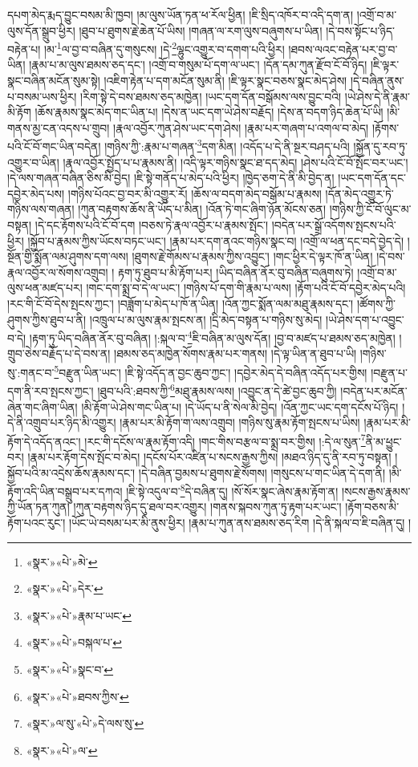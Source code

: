 དཔག་མེད་རྨད་བྱུང་བསམ་མི་ཁྱབ། །མ་ལུས་ཡོན་ཏན་ཕ་རོལ་ཕྱིན། །ཇི་སྲིད་འཁོར་བ་འདི་དག་ན། །འགྲོ་བ་མ་ལུས་དོན་སྒྲུབ་ཕྱིར། །ཐུབ་པ་ཐུགས་རྗེ་ཆེན་པོ་ཡིས། །གཞན་ལ་རག་ལུས་བཞུགས་པ་ཡིན། །དེ་བས་སྟོང་པ་ཉིད་བརྟེན་པ། །མ་\footnote{«སྣར་»«པེ་»མེ་}ལ་བྱ་བ་བཞིན་དུ་གསུངས། །དེ་\footnote{«སྣར་»«པེ་»དེར་}ལྷུང་འགྱུར་བ་དགག་པའི་ཕྱིར། །ཐབས་ལའང་བརྟེན་པར་བྱ་བ་ཡིན། །རྣམ་པ་མ་ལུས་ཐམས་ཅད་དང་། །འགྲོ་བ་གསུམ་པོ་དག་ལ་ཡང་། །དོན་དམ་ཀུན་རྫོབ་ངོ་བོ་ཉིད། །ཇི་ལྟར་སྣང་བཞིན་མངོན་སུམ་སྟེ། །འཇིག་རྟེན་པ་དག་མངོན་སུམ་ནི། །ཇི་ལྟར་སྣང་བཅས་སྣང་མེད་ཤེས། །དེ་བཞིན་ནུས་པ་བསམ་ཡས་ཕྱིར། །རིག་སྟེ་དེ་བས་ཐམས་ཅད་མཁྱེན། །ཡང་དག་དོན་བསྒོམས་ལས་བྱུང་བའི། །ཡེ་ཤེས་དེ་ནི་རྣམ་མི་རྟོག །ཆོས་རྣམས་སྣང་མེད་གང་ཡིན་པ། །དེས་ན་ཡང་དག་ཡེ་ཤེས་བརྗོད། །དེས་ན་བདག་ཉིད་ཆེན་པོ་ཡི། །མི་གནས་མྱ་ངན་འདས་པ་གྲུབ། །རྣལ་འབྱོར་ཀུན་ཤེས་ཡང་དག་ཤེས། །རྣམ་པར་གཞག་པ་འགལ་བ་མེད། །རྟོགས་པའི་ངོ་བོ་གང་ཡིན་བདེན། །གཉིས་ཀྱི་:རྣམ་པ་གཞན་\footnote{«སྣར་»«པེ་»རྣམ་པ་ཡང་}དག་མིན། །འདོད་པ་དེ་ནི་སྔར་བཤད་པའི། །སྐྱོན་དུ་རབ་ཏུ་འགྱུར་བ་ཡིན། །རྣལ་འབྱོར་སྤྱོད་པ་པ་རྣམས་ནི། །འདི་ལྟར་གཉིས་སྣང་ཐ་དད་མེད། །ཤེས་པའི་ངོ་བོ་སྤོང་བར་ཡང་། །དེ་ལས་གཞན་བཞིན་ཅིས་མི་བྱེད། །ཇི་སྟེ་གནོད་པ་མེད་པའི་ཕྱིར། །ཁྱེད་ཅག་དེ་ནི་མི་བྱེད་ན། །ཡང་དག་དོན་དང་དབྱེར་མེད་པས། །གཉིས་པོའང་བྱ་བར་མི་འགྱུར་རོ། །ཆོས་ལ་བདག་མེད་བསྒོམ་པ་རྣམས། །དོན་མེད་འགྱུར་ཏེ་གཉིས་ལས་གཞན། །ཀུན་བརྟགས་ཆོས་ནི་ཡོད་པ་མིན། །འོན་ཏེ་གང་ཞིག་ཉོན་མོངས་ཅན། །གཉིས་ཀྱི་ངོ་བོ་ལུང་མ་བསྟན། །དེ་དང་རྟོགས་པའི་ངོ་བོ་དག །བཅས་ཏེ་རྣལ་འབྱོར་པ་རྣམས་སྤོང་། །བདེན་པར་སྒྲོ་འདོགས་སྤངས་པའི་ཕྱིར། །སྐྱོབ་པ་རྣམས་ཀྱིས་ཡོངས་བཏང་ཡང་། །རྣམ་པར་དག་ནའང་གཉིས་སྣང་བ། །འགྲོ་ལ་ཕན་དང་བདེ་བྱེད་དེ། །སྔོན་གྱི་སྨོན་ལམ་ཤུགས་དག་ལས། །ཐུགས་རྗེ་གོམས་པ་རྣམས་ཀྱིས་འབྱུང་། །གང་ཕྱིར་དེ་ལྟར་ཁོ་ན་ཡིན། །དེ་བས་རྣལ་འབྱོར་ལ་སོགས་འགྲུབ། །
རྟག་ཏུ་ཐུབ་པ་མི་རྟོག་པར། །ཡིད་བཞིན་ནོར་བུ་བཞིན་བཞུགས་ཏེ། །འགྲོ་བ་མ་ལུས་ཕན་མཛད་པར། །གང་དག་སྨྲ་བ་དེ་ལ་ཡང་། །གཉིས་པོ་དག་གི་རྣམ་པ་ལས། །རྟོག་པའི་ངོ་བོ་དབྱེར་མེད་པའི། །རང་གི་ངོ་བོ་དེས་སྤངས་ཀྱང་། །བཟློག་པ་མེད་པ་ཁོ་ན་ཡིན། །འོན་ཀྱང་སྨོན་ལམ་མཐུ་རྣམས་དང་། །ཚོགས་ཀྱི་ཤུགས་ཀྱིས་ཐུབ་པ་ནི། །འཁྲུལ་པ་མ་ལུས་རྣམ་སྤངས་ན། །དྲི་མེད་བསྟན་པ་གཉིས་སུ་མེད། །ཡེ་ཤེས་དག་པ་འབྱུང་བ་དེ། །རྟག་ཏུ་ཡིད་བཞིན་ནོར་བུ་བཞིན། །:སྐལ་བ་\footnote{«སྣར་»«པེ་»བསྐལ་པ་}ཇི་བཞིན་མ་ལུས་དོན། །བྱ་བ་མཛད་པ་ཐམས་ཅད་མཁྱེན། །གྲུབ་ཅེས་བརྗོད་པ་དེ་བས་ན། །ཐམས་ཅད་མཁྱེན་སོགས་རྣམ་པར་གནས། །དེ་ལྟ་ཡིན་ན་ཐུབ་པ་ཡི། །གཉིས་སུ་:གནང་བ་\footnote{«སྣར་»«པེ་»སྣང་བ་}བརྫུན་ཡིན་ཡང་། །ཇི་སྟེ་འདོད་ན་བྱང་ཆུབ་ཀྱང་། །དབྱེར་མེད་དེ་བཞིན་འདོད་པར་གྱིས། །བརྫུན་པ་དག་ནི་རབ་སྤངས་ཀྱང་། །ཐུབ་པའི་:ཐབས་ཀྱི་\footnote{«སྣར་»«པེ་»ཐབས་ཀྱིས་}མཐུ་རྣམས་ལས། །འབྱུང་ན་དེ་ཚེ་བྱང་ཆུབ་ཀྱི། །བདེན་པར་མངོན་ཞེན་གང་ཞིག་ཡིན། །མི་རྟོག་ཡེ་ཤེས་གང་ཡིན་པ། །དེ་ཡོད་པ་ནི་སེལ་མི་བྱེད། །འོན་ཀྱང་ཡང་དག་དངོས་པོ་ཉིད། །དེ་ནི་འགྲུབ་པར་ཉིད་མི་འགྱུར། །རྣམ་པར་མི་རྟོག་ག་ལས་འགྲུབ། །གཉིས་སུ་རྣམ་རྟོག་སྤངས་པ་ཡིས། །རྣམ་པར་མི་རྟོག་དེ་འདོད་ནའང་། །རང་གི་དངོས་ལ་རྣམ་རྟོག་འདི། །གང་གིས་བརྩལ་བ་སྨྲ་བར་གྱིས། །:དེ་ལ་སུན་\footnote{«སྣར་»ལ་སུ་«པེ་»དེ་ལས་སུ་}ནི་མ་ཕྱུང་བར། །རྣམ་པར་རྟོག་དེས་སྤོང་བ་མེད། །དངོས་པོར་འཛིན་པ་སངས་རྒྱས་ཀྱིས། །མཐའ་ཉིད་དུ་ནི་རབ་ཏུ་བསྟན། །སྐྱོབ་པའི་མ་འདྲེས་ཆོས་རྣམས་དང་། །དེ་བཞིན་བྱམས་པ་ཐུགས་རྗེ་སོགས། །གསུངས་པ་གང་ཡིན་དེ་དག་ནི། །མི་རྟོག་འདི་ཡིན་བསྒྲུབ་པར་དཀའ། །ཇི་སྟེ་འདུལ་བ་\footnote{«སྣར་»«པེ་»ལ་}དེ་བཞིན་དུ། །སོ་སོར་སྣང་ཞེས་རྣམ་རྟོག་ན། །སངས་རྒྱས་རྣམས་ཀྱི་ཡོན་ཏན་ཀུན། །ཀུན་བརྟགས་ཉིད་དུ་ཐལ་བར་འགྱུར། །གནས་སྐབས་ཀུན་ཏུ་རྟག་པར་ཡང་། །རྟོག་བཅས་མི་རྟོག་པའང་རུང་། །ཡོང་ཡེ་བསམ་པར་མི་ནུས་ཕྱིར། །རྣམ་པ་ཀུན་ནས་ཐམས་ཅད་རིག །དེ་ནི་སྐལ་བ་ཇི་བཞིན་དུ། །
